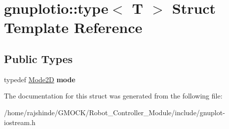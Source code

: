 \hypertarget{structgnuplotio_1_1_mode_auto_decoder_3_01_t_00_01typename_01boost_1_1enable__if__c_3_01_07_arra33ab7f3325313485a7f29355d9a819fc}{}\section{gnuplotio\+:\+:type$<$ T $>$ Struct Template Reference}
\label{structgnuplotio_1_1_mode_auto_decoder_3_01_t_00_01typename_01boost_1_1enable__if__c_3_01_07_arra33ab7f3325313485a7f29355d9a819fc}
\subsection*{Public Types}
\begin{DoxyCompactItemize}
\item 
typedef \hyperlink{structgnuplotio_1_1_mode2_d}{Mode2D} {\bfseries mode}\hypertarget{structgnuplotio_1_1_mode_auto_decoder_3_01_t_00_01typename_01boost_1_1enable__if__c_3_01_07_arra33ab7f3325313485a7f29355d9a819fc_a1574a7286cee13eedaeca8f40e7d0527}{}\label{structgnuplotio_1_1_mode_auto_decoder_3_01_t_00_01typename_01boost_1_1enable__if__c_3_01_07_arra33ab7f3325313485a7f29355d9a819fc_a1574a7286cee13eedaeca8f40e7d0527}

\end{DoxyCompactItemize}


The documentation for this struct was generated from the following file\+:\begin{DoxyCompactItemize}
\item 
/home/rajshinde/\+G\+M\+O\+C\+K/\+Robot\+\_\+\+Controller\+\_\+\+Module/include/gnuplot-\/iostream.\+h\end{DoxyCompactItemize}
